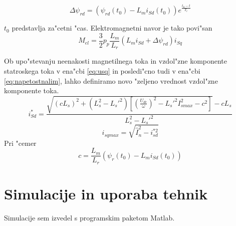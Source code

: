 \documentclass[journal,a4paper,twoside]{sty/IEEEtran}
\begin{document}
 \begin{equation}
\label{eq:delta}
\Delta \psi_{rd}=(\psi_{rd}(t_0)-L_m i_{Sd}(t_0))e^{\frac{t_0-t}{T_r}}
\end{equation}

$t_0$ predstavlja za"cetni "cas. Elektromagnetni navor je tako povi"san
\begin{equation}
\label{navor3}
M_{el}=\frac{3}{2}p_p \frac{L_m}{L_r}(L_m i_{Sd}+\Delta \psi_{rd})i_{Sq}
\end{equation}

Ob upo"stevanju neenakosti magnetilnega toka in vzdol"zne komponente statroskega toka v ena"cbi \ref{eq:usq} in posledi"cno tudi v ena"cbi \ref{eq:napetostnalim}, lahko definiramo novo "zeljeno vrednost vzdol"zne komponente toka.
\begin{equation}
\label{eq:zeljentok2}
i_{Sd}^*=\frac{\sqrt{(c L_s)^2+(L_s^2-L_s'^2)[(\frac{U_{dc}}{\omega})^2-L_s'^2I_{smax}^2-c^2]}-cL_s}{L_s^2-L_s'^2}
\end{equation}
\begin{equation}
i_{sqmax}=\sqrt{\hat{I}_n^2-i_{sd}^{*2}}
\end{equation}
Pri "cemer
$$c=\frac{L_m}{L_r}(\psi_{r}(t_0)-L_m i_{Sd}(t_0))$$


\section{Simulacije in uporaba tehnik}
Simulacije sem izvedel s programskim paketom Matlab.
\end{document}
